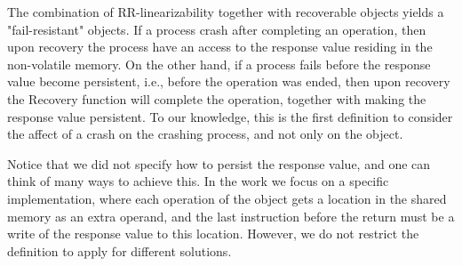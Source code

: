 The combination of RR-linearizability together with recoverable objects yields a "fail-resistant" objects. If a process crash after completing an operation, then upon recovery the process have an access to the response value residing in the non-volatile memory. On the other hand, if a process fails before the response value become persistent, i.e., before the operation was ended, then upon recovery the Recovery function will complete the operation, together with making the response value persistent. To our knowledge, this is the first definition to consider the affect of a crash on the crashing process, and not only on the object.

Notice that we did not specify how to persist the response value, and one can think of many ways to achieve this. In the work we focus on a specific implementation, where each operation of the object gets a location in the shared memory as an extra operand, and the last instruction before the return must be a write of the response value to this location. However, we do not restrict the definition to apply for different solutions.

